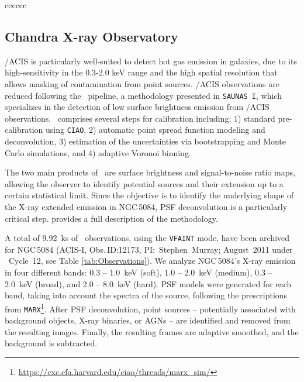\documentclass[modern]{aastex631}
\begin{document}
\begin{deluxetable*}{cccccc}
\enddata
{}
\end{deluxetable*}

\subsection{Chandra X-ray Observatory}
 \label{sec:data_chandra}

\Chandra/ACIS is particularly well-suited to detect hot gas emission in galaxies, due to its high-sensitivity in the 0.3-2.0 keV range and the high spatial resolution that allows masking of contamination from point sources. \Chandra/ACIS observations are reduced following the \SAUNAS\ pipeline, a methodology presented in \texttt{SAUNAS I}, which specializes in the detection of low surface brightness emission from \Chandra/ACIS observations. \SAUNAS\ comprises several steps for calibration including: 1) standard pre-calibration using \texttt{CIAO}, 2) automatic point spread function modeling and deconvolution, 3) estimation of the uncertainties via bootstrapping and Monte Carlo simulations, and 4) adaptive Voronoi binning.

The two main products of \SAUNAS\ are surface brightness and signal-to-noise ratio maps, allowing the observer to identify potential sources and their extension up to a certain statistical limit. Since the objective is to identify the underlying shape of the X-ray extended emission in NGC\,5084, PSF deconvolution is a particularly critical step. \citet{borlaff+2024apj967_169} provides a full description of the methodology.

A total of 9.92~ks of \Chandra\ observations, using the \texttt{VFAINT} mode, have been archived for NGC\,5084 (ACIS-I, Obs.\,ID:12173, PI:~Stephen~Murray; August~2011 under \Chandra\ Cycle~12, see Table \ref{tab:Observations}). We analyze NGC\,5084's X-ray emission in four different bands: 0.3 -- 1.0~keV (soft), 1.0 -- 2.0~keV (medium), 0.3 -- 2.0~keV (broad), and 2.0 -- 8.0~keV (hard). PSF models were generated for each band, taking into account the spectra of the source, following the prescriptions from \texttt{MARX}\footnote{\url{https://cxc.cfa.harvard.edu/ciao/threads/marx_sim/}}. After PSF deconvolution, point sources -- potentially associated with background objects, X-ray binaries, or AGNs -- are identified and removed from the resulting images. Finally, the resulting frames are adaptive smoothed, and the background is subtracted. 
\end{document}
